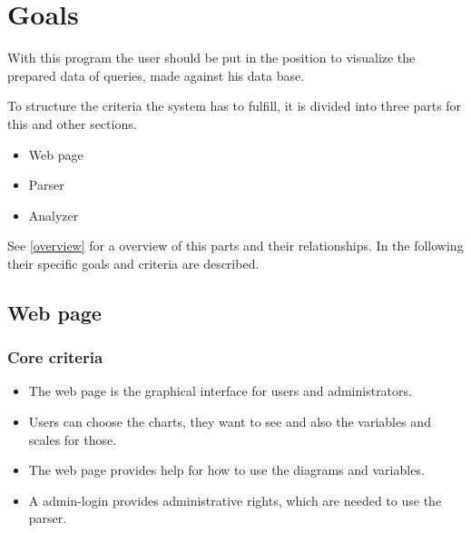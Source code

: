 \section{Goals}


With this program the user should be put in the position 
to visualize the prepared data of queries, made against his data base.


To structure the criteria the system has to fulfill, 
it is divided into three parts for this and other sections.
\begin{itemize}
  \item Web page
  \item Parser
  \item Analyzer
\end{itemize}
See \ref{overview} for a overview of this parts and their relationships.
In the following their specific goals and criteria are described.
 

% 


\subsection{Web page}
\subsubsection{Core criteria}
\begin{itemize}
\item The web page is the graphical interface for users and administrators.

\item Users can choose the charts, they want to see 
and also the variables and scales for those.

\item The web page provides help for how to use the diagrams and variables.

\item A admin-login provides administrative rights, which are needed to use the parser.
\end{itemize}

